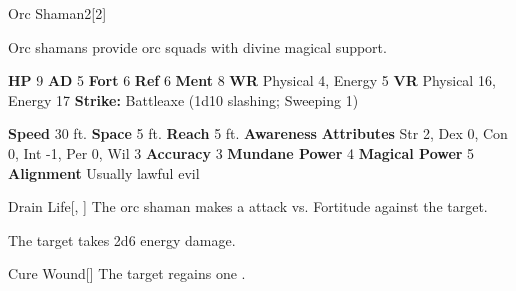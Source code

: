   \begin{monsubsection}{Orc Shaman}{2}[2]
    \vspace{-1em}\vspace{-1em}
    \vspace{0em}

    
          Orc shamans provide orc squads with divine magical support.
        

    \begin{spellcontent}
      \begin{spelltargetinginfo}
        \pari \textbf{HP} 9 \monsep
          \textbf{AD} 5 \monsep
          \textbf{Fort} 6 \monsep
          \textbf{Ref} 6 \monsep
          \textbf{Ment} 8
        \pari \textbf{WR} Physical 4, Energy 5 \monsep
        \textbf{VR} Physical 16, Energy 17
        \pari \textbf{Strike:}
            Battleaxe  (1d10 slashing; Sweeping 1)
      \end{spelltargetinginfo}
    \end{spellcontent}
    \begin{monsterfooter}
      \pari \textbf{Speed} 30 ft. \monsep
        \textbf{Space} 5 ft. \monsep
        \textbf{Reach} 5 ft.
      \pari \textbf{Awareness} 
      \pari \textbf{Attributes}
        Str 2, Dex 0,
        Con 0, Int -1,
        Per 0, Wil 3
      \pari \textbf{Accuracy} 3 \monsep
        \textbf{Mundane Power} 4 \monsep
      \textbf{Magical Power} 5
      \pari \textbf{Alignment} Usually lawful evil
    \end{monsterfooter}
  \end{monsubsection}
  \begin{freeability}{Drain Life}[, ]
       The orc shaman makes a  attack
        vs. Fortitude against the target.
    
    \hit The target takes 2d6 energy damage.
    \end{freeability}
  
      
    \begin{freeability}{Cure Wound}[]
      The target regains one .
    \end{freeability}
  
